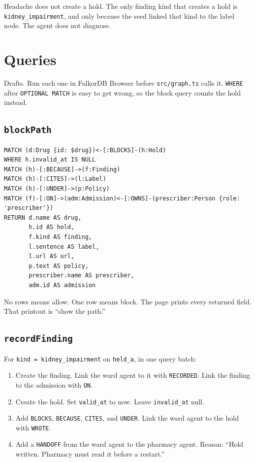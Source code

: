 \documentclass[11pt,a4paper]{article}
\newcommand{\code}[1]{\texttt{#1}}
\newcommand{\file}[1]{\texttt{#1}}
\begin{document}
Headache does not create a hold. The only finding kind that creates a hold is \code{kidney\_impairment}, and only because the seed linked that kind to the label node. The agent does not diagnose.

\section{Queries}

Drafts. Run each one in FalkorDB Browser before \file{src/graph.ts} calls it.
\code{WHERE} after \code{OPTIONAL MATCH} is easy to get wrong, so the block query counts the hold instead.

\subsection{\code{blockPath}}

\begin{lstlisting}
MATCH (d:Drug {id: $drug})<-[:BLOCKS]-(h:Hold)
WHERE h.invalid_at IS NULL
MATCH (h)-[:BECAUSE]->(f:Finding)
MATCH (h)-[:CITES]->(l:Label)
MATCH (h)-[:UNDER]->(p:Policy)
MATCH (f)-[:ON]->(adm:Admission)<-[:OWNS]-(prescriber:Person {role: 'prescriber'})
RETURN d.name AS drug,
       h.id AS hold,
       f.kind AS finding,
       l.sentence AS label,
       l.url AS url,
       p.text AS policy,
       prescriber.name AS prescriber,
       adm.id AS admission
\end{lstlisting}

No rows means allow. One row means block. The page prints every returned field. That printout is ``show the path.''

\subsection{\code{recordFinding}}

For \code{kind = kidney\_impairment} on \code{held\_a}, in one query batch:

\begin{enumerate}
  \item Create the finding. Link the ward agent to it with \code{RECORDED}. Link the finding to the admission with \code{ON}.
  \item Create the hold. Set \code{valid\_at} to now. Leave \code{invalid\_at} null.
  \item Add \code{BLOCKS}, \code{BECAUSE}, \code{CITES}, and \code{UNDER}. Link the ward agent to the hold with \code{WROTE}.
  \item Add a \code{HANDOFF} from the ward agent to the pharmacy agent. Reason: ``Hold written. Pharmacy must read it before a restart.''
\end{enumerate}
\end{document}
